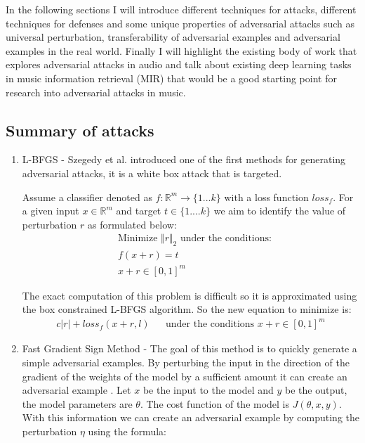 \documentclass[journal,onecolumn]{IEEEtran}
\begin{document}
In the following sections I will introduce different techniques for attacks, different techniques for defenses and some unique properties of adversarial attacks such as universal perturbation, transferability of adversarial examples and adversarial examples in the real world. Finally I will highlight the existing body of work that explores adversarial attacks in audio and talk about existing deep learning tasks in music information retrieval (MIR) that would be a good starting point for research into adversarial attacks in music.


\subsection{Summary of attacks}

\begin{enumerate}
\item L-BFGS - Szegedy et al. \cite{szegedy_intriguing_2013} introduced one of the first methods for generating adversarial attacks, it is a white box attack that is targeted.

Assume a classifier denoted as $f : \mathbb{R}^m \rightarrow \{1...k\} $ with a loss function $loss_f$. For a given input $x \in \mathbb{R}^m$ and target $t \in \{1....k\}$ we aim to identify the value of perturbation $r$ as formulated below:
\begin{align*}
&  \text{Minimize  $\Vert r \Vert_2$ under the conditions:}\\
& f(x+r)= t \\
& x+r\in [0,1]^m
\end{align*}

The exact computation of this problem is difficult so it is approximated using the box constrained L-BFGS algorithm. So the new equation to minimize is:
\begin{align*}
c \vert r \vert + loss_f(x+r,l) && \text{under the conditions $x+r \in [0,1]^m$}
\end{align*}

\item Fast Gradient Sign Method - The goal of this method is to quickly generate a simple adversarial examples. By perturbing the input in the direction of the gradient of the weights of the model by a sufficient amount it can create an adversarial example \cite{goodfellow_explaining_2014}. Let $x$ be the input to the model and $y$ be the output, the model parameters are $\theta$. The cost function of the model is $J(\theta,x,y)$. With this information we can create an adversarial example by computing the perturbation $\eta$ using the formula:


\end{enumerate}
\end{document}
